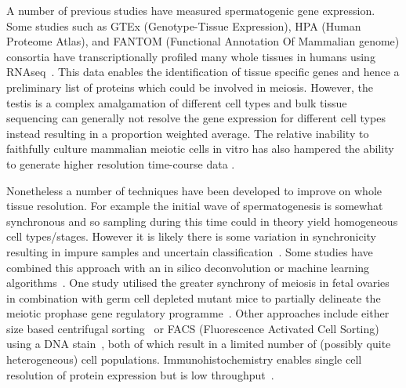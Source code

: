 A number of previous studies have measured spermatogenic gene expression.
Some studies such as GTEx (Genotype-Tissue Expression), HPA (Human Proteome Atlas), and FANTOM (Functional Annotation Of Mammalian genome) consortia have transcriptionally profiled many whole tissues in humans using RNAseq~\parencite{Mele2015Human,Uhlen2015Tissuebased,Uhlen2016Transcriptomics}.
This data enables the identification of tissue specific genes and hence a preliminary list of proteins which could be involved in meiosis.
 However, the testis is a complex amalgamation of different cell types and bulk tissue sequencing can generally not resolve the gene expression for different cell types instead resulting in a proportion weighted average.
The relative inability to faithfully culture mammalian meiotic cells in vitro has also hampered the ability to generate higher resolution time-course data \parencite{Zhou2016Complete, Hikabe2016Reconstitution}.

Nonetheless a number of techniques have been developed to improve on whole tissue resolution.
For example the initial wave of spermatogenesis is somewhat synchronous and so sampling during this time could in theory yield homogeneous cell types/stages.
However it is likely there is some variation in synchronicity resulting in impure samples and uncertain classification~\parencite{Laiho2013Transcriptome,Ball2016Regulatory}.
Some studies have combined this approach with an in silico deconvolution or machine learning algorithms~\parencite{Margolin2014Integrated,Li2013Identification}.
One study utilised the greater synchrony of meiosis in fetal ovaries in combination with germ cell depleted mutant mice to partially delineate the meiotic prophase gene regulatory programme~\parencite{Soh2015Gene}.
Other approaches include either size based centrifugal sorting~\parencite{Soumillon2013Cellular,Buard2009Distinct,Grabske1975Centrifugal} or FACS (Fluorescence Activated Cell Sorting) using a DNA stain~\parencite{daCruz2016Transcriptome}, both of which result in a limited number of (possibly quite heterogeneous) cell populations.
Immunohistochemistry enables single cell resolution of protein expression but is low throughput~\parencite{Djureinovic2014human}.




